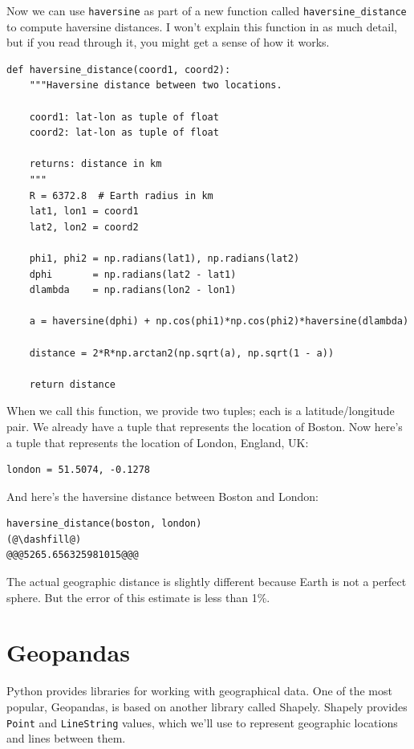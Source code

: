 Now we can use \passthrough{\lstinline!haversine!} as part of a new function called \passthrough{\lstinline!haversine_distance!} to compute haversine distances. I won't explain this function in as
much detail, but if you read through it, you might get a sense of how it
works.

\begin{lstlisting}[]
def haversine_distance(coord1, coord2):
    """Haversine distance between two locations.
    
    coord1: lat-lon as tuple of float 
    coord2: lat-lon as tuple of float
    
    returns: distance in km
    """
    R = 6372.8  # Earth radius in km
    lat1, lon1 = coord1
    lat2, lon2 = coord2
    
    phi1, phi2 = np.radians(lat1), np.radians(lat2) 
    dphi       = np.radians(lat2 - lat1)
    dlambda    = np.radians(lon2 - lon1)
    
    a = haversine(dphi) + np.cos(phi1)*np.cos(phi2)*haversine(dlambda)
    
    distance = 2*R*np.arctan2(np.sqrt(a), np.sqrt(1 - a))
    
    return distance
\end{lstlisting}

When we call this function, we provide two tuples; each is a
latitude/longitude pair. We already have a tuple that represents the
location of Boston. Now here's a tuple that represents the location of
London, England, UK:

\begin{lstlisting}[]
london = 51.5074, -0.1278
\end{lstlisting}
And here's the haversine distance between Boston and London:

\begin{lstlisting}[]
haversine_distance(boston, london)
(@\dashfill@)
@@@5265.656325981015@@@
\end{lstlisting}

The actual geographic distance is slightly different because Earth is
not a perfect sphere. But the error of this estimate is less than 1\%.

\hypertarget{geopandas}{%
\section{Geopandas}\label{geopandas}}

Python provides libraries for working with geographical data. One of the
most popular, Geopandas, is based on another library called
Shapely. Shapely provides \passthrough{\lstinline!Point!} and
\passthrough{\lstinline!LineString!} values, which we'll use to
represent geographic locations and lines between them.

